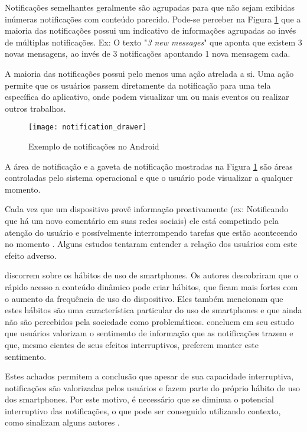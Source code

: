 Notificações semelhantes geralmente são agrupadas para que não sejam exibidas inúmeras notificações com conteúdo parecido.
Pode-se perceber na Figura \ref{notification-drawer} que a maioria das notificações possui um indicativo de informações agrupadas
ao invés de múltiplas notificações. Ex: O texto "\textit{3 new messages}" que aponta que existem 3 novas mensagens, ao invés de 3
notificações apontando 1 nova mensagem cada.

A maioria das notificações possui pelo menos uma ação atrelada a si. Uma ação permite que os usuários passem
diretamente da notificação para uma tela específica do aplicativo, onde podem visualizar um ou mais eventos ou realizar
outros trabalhos.

\begin{figure}[h]
\centering
\texttt{[image: notification\_drawer]}
\caption{Exemplo de notificações no Android \cite{notificationDrawer}}
\label{notification-drawer}
\end{figure}

A área de notificação e a gaveta de notificação mostradas na Figura \ref{notification-drawer} são áreas controladas pelo
sistema operacional e que o usuário pode visualizar a qualquer momento.

Cada vez que um dispositivo provê informação proativamente (ex: Notificando que há um novo comentário em suas redes
sociais) ele está competindo pela atenção do usuário e possívelmente interrompendo tarefas que estão acontecendo no momento
\cite{ho2005using}. Alguns estudos tentaram entender a relação dos usuários com este efeito adverso.

 discorrem sobre os hábitos de uso de smartphones. Os autores descobriram que o rápido acesso a
conteúdo dinâmico pode criar hábitos, que ficam mais fortes com o aumento da frequência de uso do dispositivo. Eles
também mencionam que estes hábitos são uma característica particular do uso de smartphones e que ainda não são percebidos
pela sociedade como problemáticos.  concluem em seu estudo que usuários valorizam o sentimento
de informação que as notificações trazem e que, mesmo cientes de seus efeitos interruptivos, preferem manter este sentimento.

Estes achados permitem a conclusão que apesar de sua capacidade interruptiva, notificações são valorizadas pelos
usuários e fazem parte do próprio hábito de uso dos smartphones. Por este motivo, é necessário que se diminua o potencial
interruptivo das notificações, o que pode ser conseguido utilizando contexto, como sinalizam alguns autores
\cite{ho2005using, kern2003context, iqbal2010notifications}.

